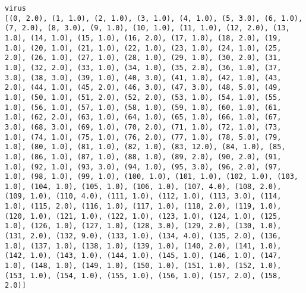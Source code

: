 \documentclass[11pt]{article}
\begin{document}
    \begin{Verbatim}[commandchars=\\\{\}]
virus
[(0, 2.0), (1, 1.0), (2, 1.0), (3, 1.0), (4, 1.0), (5, 3.0), (6, 1.0), (7, 2.0), (8, 3.0), (9, 1.0), (10, 1.0), (11, 1.0), (12, 2.0), (13, 1.0), (14, 1.0), (15, 1.0), (16, 2.0), (17, 1.0), (18, 2.0), (19, 1.0), (20, 1.0), (21, 1.0), (22, 1.0), (23, 1.0), (24, 1.0), (25, 2.0), (26, 1.0), (27, 1.0), (28, 1.0), (29, 1.0), (30, 2.0), (31, 1.0), (32, 2.0), (33, 1.0), (34, 1.0), (35, 2.0), (36, 1.0), (37, 3.0), (38, 3.0), (39, 1.0), (40, 3.0), (41, 1.0), (42, 1.0), (43, 2.0), (44, 1.0), (45, 2.0), (46, 3.0), (47, 3.0), (48, 5.0), (49, 1.0), (50, 1.0), (51, 2.0), (52, 2.0), (53, 1.0), (54, 1.0), (55, 1.0), (56, 1.0), (57, 1.0), (58, 1.0), (59, 1.0), (60, 1.0), (61, 1.0), (62, 2.0), (63, 1.0), (64, 1.0), (65, 1.0), (66, 1.0), (67, 3.0), (68, 3.0), (69, 1.0), (70, 2.0), (71, 1.0), (72, 1.0), (73, 1.0), (74, 1.0), (75, 1.0), (76, 2.0), (77, 1.0), (78, 5.0), (79, 1.0), (80, 1.0), (81, 1.0), (82, 1.0), (83, 12.0), (84, 1.0), (85, 1.0), (86, 1.0), (87, 1.0), (88, 1.0), (89, 2.0), (90, 2.0), (91, 1.0), (92, 1.0), (93, 3.0), (94, 1.0), (95, 3.0), (96, 2.0), (97, 1.0), (98, 1.0), (99, 1.0), (100, 1.0), (101, 1.0), (102, 1.0), (103, 1.0), (104, 1.0), (105, 1.0), (106, 1.0), (107, 4.0), (108, 2.0), (109, 1.0), (110, 4.0), (111, 1.0), (112, 1.0), (113, 3.0), (114, 1.0), (115, 2.0), (116, 1.0), (117, 1.0), (118, 2.0), (119, 1.0), (120, 1.0), (121, 1.0), (122, 1.0), (123, 1.0), (124, 1.0), (125, 1.0), (126, 1.0), (127, 1.0), (128, 3.0), (129, 2.0), (130, 1.0), (131, 2.0), (132, 9.0), (133, 1.0), (134, 4.0), (135, 2.0), (136, 1.0), (137, 1.0), (138, 1.0), (139, 1.0), (140, 2.0), (141, 1.0), (142, 1.0), (143, 1.0), (144, 1.0), (145, 1.0), (146, 1.0), (147, 1.0), (148, 1.0), (149, 1.0), (150, 1.0), (151, 1.0), (152, 1.0), (153, 1.0), (154, 1.0), (155, 1.0), (156, 1.0), (157, 2.0), (158, 2.0)]

\end{Verbatim}
\end{document}
